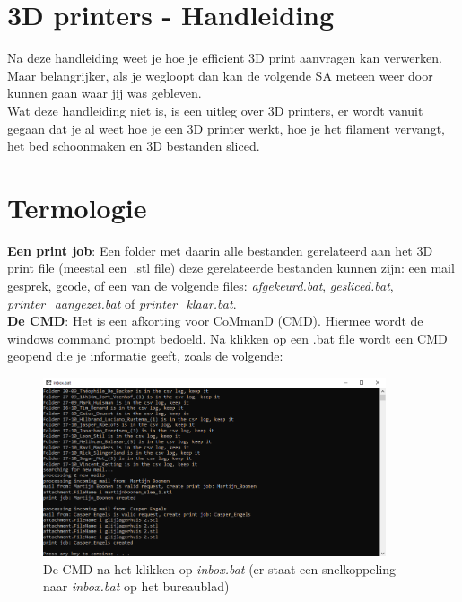 \documentclass{article}
\begin{document}
\pagestyle{empty}
\large
\section*{\centering\hspace{-1cm}3D printers - Handleiding}
Na deze handleiding weet je hoe je efficient 3D print aanvragen kan verwerken. Maar belangrijker, als je wegloopt dan kan de volgende SA meteen weer door kunnen gaan waar jij was gebleven.\\

Wat deze handleiding niet is, is een uitleg over 3D printers, er wordt vanuit gegaan dat je al weet hoe je een 3D printer werkt, hoe je het filament vervangt, het bed schoonmaken en 3D bestanden sliced.\\

\section*{Termologie}
\noindent\textbf{Een print job}: Een folder met daarin alle bestanden gerelateerd aan het 3D print file (meestal een~.stl file) deze gerelateerde bestanden kunnen zijn: een mail gesprek, gcode, of een van de volgende files: \textit{afgekeurd.bat}, \textit{gesliced.bat}, \textit{printer\_aangezet.bat} of \textit{printer\_klaar.bat}.\\

\noindent\textbf{De CMD}: Het is een afkorting voor CoMmanD (CMD). Hiermee wordt de windows command prompt bedoeld. Na klikken op een .bat file wordt een CMD geopend die je informatie geeft, zoals de volgende:
\begin{figure}[H]
    \centering
    \includegraphics[width=0.9\textwidth]{figures/cmd}
    \caption*{De CMD na het klikken op \textit{inbox.bat} (er staat een snelkoppeling naar \textit{inbox.bat} op het bureaublad)}%
\end{figure}
\end{document}
